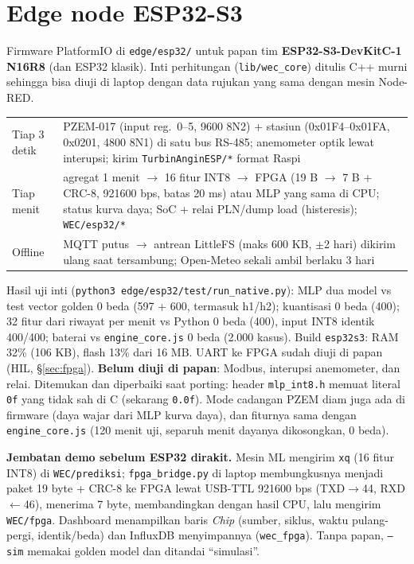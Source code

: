 \documentclass[10.5pt,a4paper]{article}
\newcommand{\cmd}[1]{\texttt{#1}}
\begin{document}
\section{Edge node ESP32-S3}\label{sec:esp32}
Firmware PlatformIO di \cmd{edge/esp32/} untuk papan tim \textbf{ESP32-S3-DevKitC-1 N16R8} (dan ESP32 klasik). Inti perhitungan (\cmd{lib/wec\_core}) ditulis C++ murni
sehingga bisa diuji di laptop dengan data rujukan yang sama dengan mesin Node-RED.
\begin{center}
\small
\begin{tabularx}{\linewidth}{@{}l X@{}}
\toprule
Tiap 3 detik & PZEM-017 (input reg.\ 0--5, 9600 8N2) + stasiun (0x01F4--0x01FA, 0x0201, 4800 8N1) di satu bus RS-485; anemometer optik lewat interupsi; kirim \cmd{TurbinAnginESP/*} format Raspi \\
Tiap menit & agregat 1 menit $\to$ 16 fitur INT8 $\to$ FPGA (19 B $\to$ 7 B + CRC-8, 921600 bps, batas 20 ms) atau MLP yang sama di CPU; status kurva daya; SoC + relai PLN/dump load (histeresis); \cmd{WEC/esp32/*} \\
Offline & MQTT putus $\to$ antrean LittleFS (maks 600 KB, $\pm$2 hari) dikirim ulang saat tersambung; Open-Meteo sekali ambil berlaku 3 hari \\
\bottomrule
\end{tabularx}
\end{center}
Hasil uji inti (\cmd{python3 edge/esp32/test/run\_native.py}): MLP dua model vs test vector golden 0 beda (597 + 600, termasuk h1/h2); kuantisasi 0 beda (400);
32 fitur dari riwayat per menit vs Python 0 beda (400), input INT8 identik 400/400; baterai vs \cmd{engine\_core.js} 0 beda (2.000 kasus).
Build \cmd{esp32s3}: RAM 32\% (106 KB), flash 13\% dari 16 MB. UART ke FPGA sudah diuji di papan (HIL, \S\ref{sec:fpga}). \textbf{Belum diuji di papan}: Modbus, interupsi anemometer, dan relai.
Ditemukan dan diperbaiki saat porting: header \cmd{mlp\_int8.h} memuat literal \cmd{0f} yang tidak sah di C (sekarang \cmd{0.0f}). Mode cadangan PZEM diam juga ada di firmware (daya wajar dari MLP kurva daya), dan fiturnya sama dengan \cmd{engine\_core.js} (120 menit uji, separuh menit dayanya dikosongkan, 0 beda).

\textbf{Jembatan demo sebelum ESP32 dirakit.} Mesin ML mengirim \cmd{xq} (16 fitur INT8) di \cmd{WEC/prediksi}; \cmd{fpga\_bridge.py} di laptop membungkusnya menjadi paket 19 byte + CRC-8 ke FPGA lewat USB-TTL 921600 bps (TXD$\to$44, RXD$\leftarrow$46), menerima 7 byte, membandingkan dengan hasil CPU, lalu mengirim \cmd{WEC/fpga}. Dashboard menampilkan baris \emph{Chip} (sumber, siklus, waktu pulang-pergi, identik/beda) dan InfluxDB menyimpannya (\cmd{wec\_fpga}). Tanpa papan, \cmd{--sim} memakai golden model dan ditandai ``simulasi''.
\end{document}
